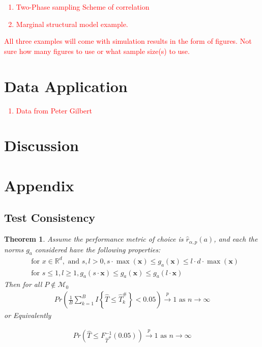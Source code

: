 \documentclass{article}
\newtheorem{theorem}{Theorem}
\newcommand{\sh}{\textcolor{red}}
\begin{document}
\sh{
\begin{enumerate}
	\item Two-Phase sampling Scheme of correlation
	\item Marginal structural model example.
\end{enumerate}
All three examples will come with simulation results in the form of figures.  Not sure how many figures to use or what sample size(s) to use.
}

\section{Data Application}

\sh{\begin{enumerate}
	\item Data from Peter Gilbert
\end{enumerate}
}

\section{Discussion}

\section{Appendix}

\subsection{Test Consistency}
\label{sec:test_cnsty}

\begin{theorem}
\label{thm:cnst}
Assume the performance metric of choice is $\hat{r}_{\alpha, p}(a)$, and each the norms $g_a$ considered have the following properties: 
\begin{align}
& \text{for } x \in \mathbb{R}^d, \text{ and } s, l > 0, s \cdot \max({\boldsymbol{x}}) \leq g_a(\boldsymbol{x}) \leq l \cdot d \cdot \max({\boldsymbol{x}}) \label{eqn:nrm_bounds}\\
& \text{for } s \leq 1, l \geq 1, g_a(s \cdot \boldsymbol{x}) \leq g_a(\boldsymbol{x}) \leq g_a(l \cdot \boldsymbol{x}) \label{eqn:linegrowth}
\end{align}
Then for all $P \not \in \mathscr{M}_0$ 
\begin{align*}
	Pr \left(\frac{1}{B}\sum_{k = 1}^B I\left\{\hat{T} \leq \hat{T}_k^{\#}\right\} < 0.05\right) \xrightarrow{p} 1 \text{ as } n \to \infty
\end{align*}
or Equivalently 

\begin{align*}
Pr\left(\hat{T} \leq F^{-1}_{\hat{T}^\#}(0.05)\right) \xrightarrow{p} 1 \text{ as } n \to \infty
\end{align*}
\end{theorem}
\end{document}
